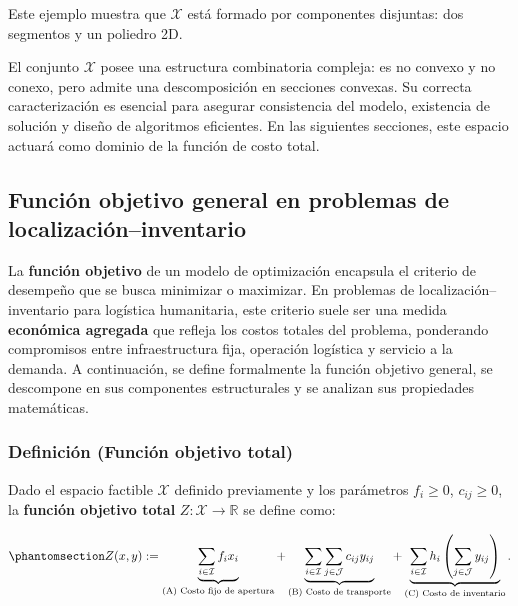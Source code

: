 \documentclass[
  spanish,
  us-letterpaper,
]{scrreprt}
\numberwithin{equation}{section}
\begin{document}
Este ejemplo muestra que \(\mathcal{X}\) está formado por componentes
disjuntas: dos segmentos y un poliedro 2D.

El conjunto \(\mathcal{X}\) posee una estructura combinatoria compleja:
es no convexo y no conexo, pero admite una descomposición en secciones
convexas. Su correcta caracterización es esencial para asegurar
consistencia del modelo, existencia de solución y diseño de algoritmos
eficientes. En las siguientes secciones, este espacio actuará como
dominio de la función de costo total.

\subsection{Función objetivo general en problemas de
localización--inventario}\label{funciuxf3n-objetivo-general-en-problemas-de-localizaciuxf3ninventario}

La \textbf{función objetivo} de un modelo de optimización encapsula el
criterio de desempeño que se busca minimizar o maximizar. En problemas
de localización--inventario para logística humanitaria, este criterio
suele ser una medida \textbf{económica agregada} que refleja los costos
totales del problema, ponderando compromisos entre infraestructura fija,
operación logística y servicio a la demanda. A continuación, se define
formalmente la función objetivo general, se descompone en sus
componentes estructurales y se analizan sus propiedades matemáticas.

\subsubsection{\texorpdfstring{\textbf{Definición (Función objetivo
total)}}{Definición (Función objetivo total)}}\label{definiciuxf3n-funciuxf3n-objetivo-total}

Dado el espacio factible \(\mathcal{X}\) definido previamente y los
parámetros \(f_i \ge 0\), \(c_{ij} \ge 0\), la \textbf{función objetivo
total} \(Z: \mathcal{X} \to \mathbb{R}\) se define como:

\begin{equation}\phantomsection\label{eq-funcion-obje}{
Z(x, y) :=
\underbrace{\sum_{i \in \mathcal{I}} f_i x_i}_{\text{(A) Costo fijo de apertura}}
+
\underbrace{\sum_{i \in \mathcal{I}} \sum_{j \in \mathcal{J}} c_{ij} y_{ij}}_{\text{(B) Costo de transporte}}
+
\underbrace{\sum_{i \in \mathcal{I}} h_i \left( \sum_{j \in \mathcal{J}} y_{ij} \right)}_{\text{(C) Costo de inventario}}.
}\end{equation}
\end{document}
